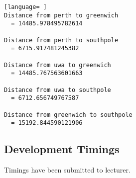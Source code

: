 \documentclass[a4paper,10pt]{article}
\begin{document}
\begin{appendices}
\begin{lstlisting}[language= ]
Distance from perth to greenwich
  = 14485.978495782614

Distance from perth to southpole
  = 6715.917481245382

Distance from uwa to greenwich
  = 14485.767563601663

Distance from uwa to southpole
  = 6712.656749767587

Distance from greenwich to southpole
  = 15192.844590121906
 \end{lstlisting}

 \subsection{Development Timings}
 Timings have been submitted to lecturer.
 
\end{appendices}
\end{document}
